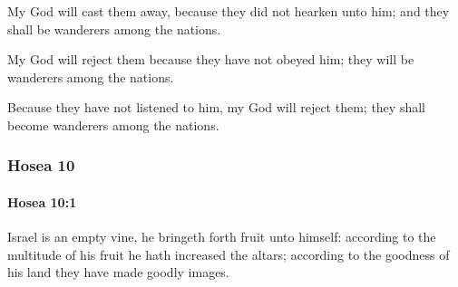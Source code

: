 			\begin{versebox}
					\item[BHS] 
					\item[LXX] 
					\item[ASV] My God will cast them away, because they did not hearken unto him; and they shall be wanderers among the nations.
					\item[NIV] My God will reject them because they have not obeyed him; they will be wanderers among the nations.
					\item[NRSV] Because they have not listened to him, my God will reject them; they shall become wanderers among the nations.
			\end{versebox}
	\subsubsection{Hosea 10} %
		\label{HOSEA-10}

		\paragraph{Hosea 10:1} %
			\label{HOSEA-10-1}

			Israel is an empty vine, he bringeth forth fruit unto himself: according to the multitude of his fruit he hath increased the altars; according to the goodness of his land they have made goodly images.

